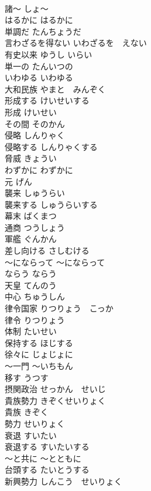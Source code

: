 \documentclass[8pt]{extreport}
\begin{document}
\begin{CJK}{UTF8}{min}
\\	諸〜	しょ〜	
\\	はるかに	はるかに	
\\	単調だ	たんちょうだ	
\\	言わざるを得ない	いわざるを　えない	
\\	有史以来	ゆうし いらい	
\\	単一の	たんいつの	
\\	いわゆる	いわゆる	
\\	大和民族	やまと　みんぞく	
\\	形成する	けいせいする	
\\	形成	けいせい	
\\	その間	そのかん	
\\	侵略	しんりゃく	
\\	侵略する	しんりゃくする	
\\	脅威	きょうい	
\\	わずかに	わずかに	
\\	元	げん	
\\	襲来	しゅうらい	
\\	襲来する	しゅうらいする	
\\	幕末	ばくまつ	
\\	通商	つうしょう	
\\	軍艦	ぐんかん	
\\	差し向ける	さしむける	
\\	〜にならって	〜にならって	
\\	ならう	ならう	
\\	天皇	てんのう	
\\	中心	ちゅうしん	
\\	律令国家	りつりょう　こっか	
\\	律令	りつりょう	
\\	体制	たいせい	
\\	保持する	ほじする	
\\	徐々に	じょじょに	
\\	〜一門	〜いちもん	
\\	移す	うつす	
\\	摂関政治	せっかん　せいじ	
\\	貴族勢力	きぞくせいりょく	
\\	貴族	きぞく	
\\	勢力	せいりょく	
\\	衰退	すいたい	
\\	衰退する	すいたいする	
\\	〜と共に	〜とともに	
\\	台頭する	たいとうする	
\\	新興勢力	しんこう　せいりょく	

\end{CJK}
\end{document}
